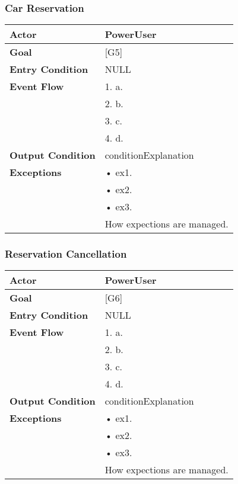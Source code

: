\subsubsection{Car Reservation}
\begin{tabular}{| l | p{8cm} |}
\hline
\textbf{Actor}      &       PowerUser \\
\hline
\textbf{Goal}       &       [G5]\\
\hline
\textbf{Entry Condition} &  NULL\\
\hline
\textbf{Event Flow}     &   1.	a.\\&
                                            2.	b.\\&
                                            3.	c.\\&
                                            4.  d.\\
\hline
\textbf{Output Condition} & conditionExplanation\\
\hline
\textbf{Exceptions} &       •   ex1.\\& 
                            •	ex2.\\&
                            •	ex3.\\& 
                           How expections are managed.\\
\hline
\end{tabular} 


\subsubsection{Reservation Cancellation}
\begin{tabular}{| l | p{8cm} |}
\hline
\textbf{Actor}      &       PowerUser \\
\hline
\textbf{Goal}       &       [G6]\\
\hline
\textbf{Entry Condition} &  NULL\\
\hline
\textbf{Event Flow}     &   1.	a.\\&
                                            2.	b.\\&
                                            3.	c.\\&
                                            4.  d.\\
\hline
\textbf{Output Condition} & conditionExplanation\\
\hline
\textbf{Exceptions} &       •   ex1.\\& 
                            •	ex2.\\&
                            •	ex3.\\& 
                           How expections are managed.\\
\hline
\end{tabular} 


